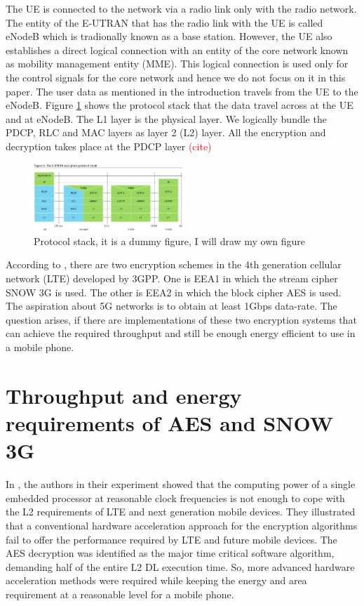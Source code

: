 The UE is connected to the network via a radio link only with the radio network. The entity of the E-UTRAN that has the radio link with the UE is called eNodeB which is tradionally known as a base station. However, the UE also establishes a direct logical connection with an entity of the core network known as mobility management entity (MME). This logical connection is used only for the control signals for the core network and hence we do not focus on it in this paper. The user data as mentioned in the introduction travels from the UE to the eNodeB. Figure \ref{fig:protocl_stack} shows the protocol stack that the data travel across at the UE and at eNodeB. The L1 layer is the physical layer. We logically bundle the PDCP, RLC and MAC layers as layer 2 (L2) layer. All the encryption and decryption takes place at the PDCP layer \textcolor{red}{(cite)}

\begin{figure}
  \includegraphics[width=0.50\textwidth]{protocl_stack.png}
\caption{Protocol stack, it is a dummy figure, I will draw my own figure}
\label{fig:protocl_stack}       %
\end{figure}

According to \cite{EEA1_EEA2}, there are two encryption schemes in the 4th generation cellular network (LTE) developed by 3GPP. One is EEA1 in which the stream cipher SNOW 3G is used. The other is EEA2 in which the block cipher AES is used. The aspiration about 5G networks is to obtain at least 1Gbps data-rate. The question arises, if there are implementations of these two encryption systems that can achieve the required throughput and still be enough energy efficient to use in a mobile phone.

\section{Throughput and energy requirements of AES and SNOW 3G}
\label{sec:throughput_and_energy_requirements_of_aes_snow3g}
In \cite{IIS_Ruhr_2009}, the authors in their experiment showed that the computing power of a single embedded processor at reasonable clock frequencies is not enough to cope with the L2 requirements of LTE and next generation mobile devices. They illustrated that a conventional hardware acceleration approach for the encryption algorithms fail to offer the performance required by LTE and future mobile devices. The AES decryption was identified as the major time critical software algorithm, demanding half of the entire L2 DL execution time. So, more advanced hardware acceleration methods were required while keeping the energy and area requirement at a reasonable level for a mobile phone.

